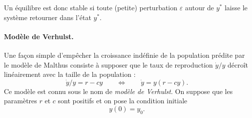 \remark
Un équilibre est donc stable si toute (petite) perturbation $\varepsilon$ autour de $y^*$ laisse le système retourner dans l'état $y^*$.


\paragraph*{Modèle de Verhulst.}
Une façon simple d'empêcher la croissance indéfinie de la population prédite par le modèle de Malthus consiste à supposer que le taux de reproduction $\dot y / y$ décroît linéairement avec la taille de la population : 
\begin{equation} \label{eq:verhulst}
\dot y / y = r - cy
\qquad \Leftrightarrow \qquad
\dot y = y(r - cy).
\end{equation}
Ce modèle est connu sous le nom de {\em modèle de Verhulst}. On suppose que les paramètres $r$ et $c$ sont positifs et on pose la condition initiale
$$
y(0) = y_0.
$$
